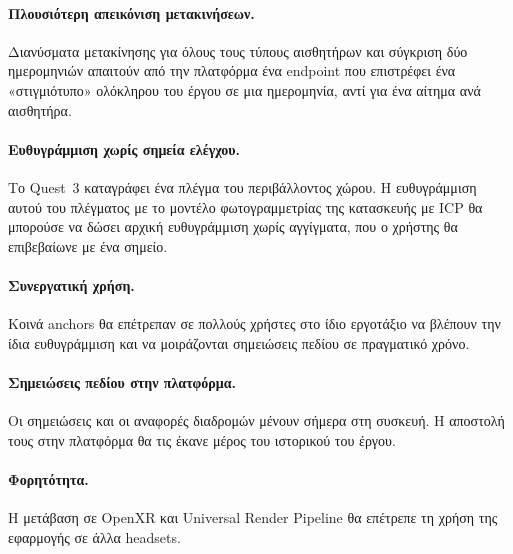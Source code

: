 \paragraph{Πλουσιότερη απεικόνιση μετακινήσεων.} Διανύσματα μετακίνησης για όλους τους τύπους αισθητήρων και σύγκριση δύο ημερομηνιών απαιτούν από την πλατφόρμα ένα endpoint που επιστρέφει ένα «στιγμιότυπο» ολόκληρου του έργου σε μια ημερομηνία, αντί για ένα αίτημα ανά αισθητήρα.

\paragraph{Ευθυγράμμιση χωρίς σημεία ελέγχου.} Το Quest~3 καταγράφει ένα πλέγμα του περιβάλλοντος χώρου. Η ευθυγράμμιση αυτού του πλέγματος με το μοντέλο φωτογραμμετρίας της κατασκευής με ICP \cite{besl1992icp} θα μπορούσε να δώσει αρχική ευθυγράμμιση χωρίς αγγίγματα, που ο χρήστης θα επιβεβαίωνε με ένα σημείο.

\paragraph{Συνεργατική χρήση.} Κοινά anchors θα επέτρεπαν σε πολλούς χρήστες στο ίδιο εργοτάξιο να βλέπουν την ίδια ευθυγράμμιση και να μοιράζονται σημειώσεις πεδίου σε πραγματικό χρόνο.

\paragraph{Σημειώσεις πεδίου στην πλατφόρμα.} Οι σημειώσεις και οι αναφορές διαδρομών μένουν σήμερα στη συσκευή. Η αποστολή τους στην πλατφόρμα θα τις έκανε μέρος του ιστορικού του έργου.

\paragraph{Φορητότητα.} Η μετάβαση σε OpenXR και Universal Render Pipeline θα επέτρεπε τη χρήση της εφαρμογής σε άλλα headsets.
